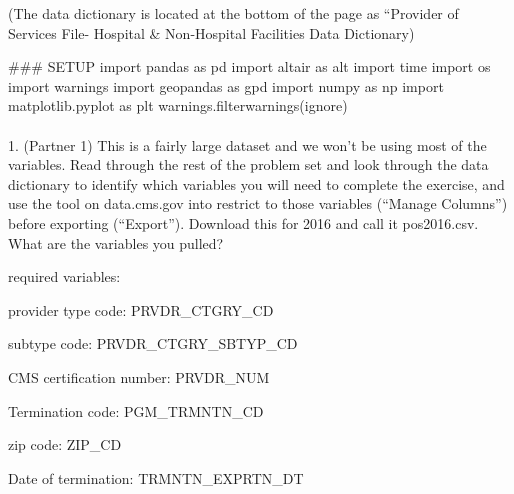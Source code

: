 \documentclass[
  letterpaper,
  DIV=11,
  numbers=noendperiod]{scrartcl}
\makeatletter
\let\oldparagraph\paragraph
\renewcommand{\paragraph}{
    \@ifstar
      \xxxParagraphStar
      \xxxParagraphNoStar
  }
\newcommand{\xxxParagraphStar}[1]{\oldparagraph*{#1}\mbox{}}
\newcommand{\xxxParagraphNoStar}[1]{\oldparagraph{#1}\mbox{}}
\newenvironment{Shaded}{\begin{snugshade}}{\end{snugshade}}
\newcommand{\CommentTok}[1]{\textcolor[rgb]{0.37,0.37,0.37}{#1}}
\newcommand{\ImportTok}[1]{\textcolor[rgb]{0.00,0.46,0.62}{#1}}
\newcommand{\NormalTok}[1]{\textcolor[rgb]{0.00,0.23,0.31}{#1}}
\newcommand{\StringTok}[1]{\textcolor[rgb]{0.13,0.47,0.30}{#1}}
\makeatother
\begin{document}
(The data dictionary is located at the bottom of the page as ``Provider
of Services File- Hospital \& Non-Hospital Facilities Data Dictionary)

\begin{Shaded}
\begin{Highlighting}[]
\CommentTok{\#\#\# SETUP }
\ImportTok{import}\NormalTok{ pandas }\ImportTok{as}\NormalTok{ pd}
\ImportTok{import}\NormalTok{ altair }\ImportTok{as}\NormalTok{ alt}
\ImportTok{import}\NormalTok{ time}
\ImportTok{import}\NormalTok{ os}
\ImportTok{import}\NormalTok{ warnings}
\ImportTok{import}\NormalTok{ geopandas }\ImportTok{as}\NormalTok{ gpd}
\ImportTok{import}\NormalTok{ numpy }\ImportTok{as}\NormalTok{ np}
\ImportTok{import}\NormalTok{ matplotlib.pyplot }\ImportTok{as}\NormalTok{ plt}
\NormalTok{warnings.filterwarnings(}\StringTok{\textquotesingle{}ignore\textquotesingle{}}\NormalTok{)}
\end{Highlighting}
\end{Shaded}

\paragraph{1. (Partner 1) This is a fairly large dataset and we won't be
using most of the variables. Read through the rest of the problem set
and look through the data dictionary to identify which variables you
will need to complete the exercise, and use the tool on data.cms.gov
into restrict to those variables (``Manage Columns'') before exporting
(``Export''). Download this for 2016 and call it pos2016.csv. What are
the variables you
pulled?}\label{partner-1-this-is-a-fairly-large-dataset-and-we-wont-be-using-most-of-the-variables.-read-through-the-rest-of-the-problem-set-and-look-through-the-data-dictionary-to-identify-which-variables-you-will-need-to-complete-the-exercise-and-use-the-tool-on-data.cms.gov-into-restrict-to-those-variables-manage-columns-before-exporting-export.-download-this-for-2016-and-call-it-pos2016.csv.-what-are-the-variables-you-pulled}

required variables:

provider type code: PRVDR\_CTGRY\_CD

subtype code: PRVDR\_CTGRY\_SBTYP\_CD

CMS certification number: PRVDR\_NUM

Termination code: PGM\_TRMNTN\_CD

zip code: ZIP\_CD

Date of termination: TRMNTN\_EXPRTN\_DT
\end{document}
